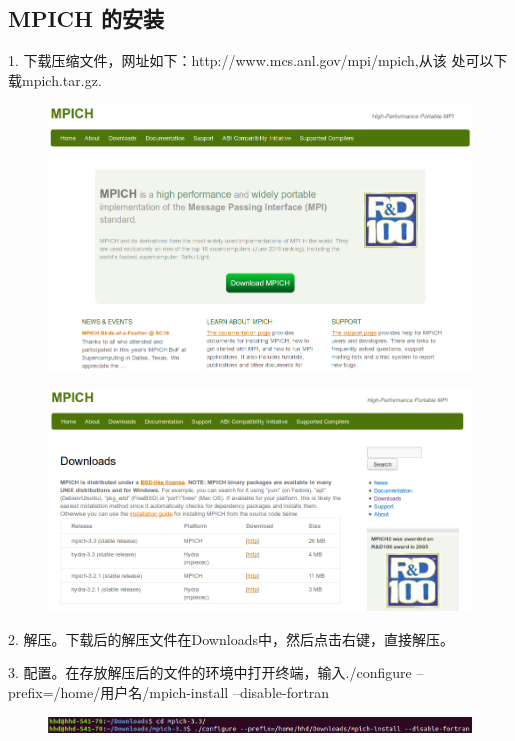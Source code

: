 \documentclass[12pt,a4paper]{article}
\begin{document}
\subsection{ MPICH 的安装 }
1. 下载压缩文件，网址如下：http://www.mcs.anl.gov/mpi/mpich,从该
处可以下载mpich.tar.gz.
\begin{figure}[H]
\centering
\includegraphics[scale=0.5]{./figures/1.png}
\caption{}
\end{figure}

\begin{figure}[H]
\centering
\includegraphics[scale=0.5]{./figures/2.png}
\caption{}
\end{figure}

2. 解压。下载后的解压文件在Downloads中，然后点击右键，直接解压。

3. 配置。在存放解压后的文件的环境中打开终端，输入./configure --prefix=/home/用户名/mpich-install --disable-fortran 
\begin{figure}[H]
\centering
\includegraphics[scale=0.5]{./figures/3.png}
\caption{}
\end{figure}
\end{document}
